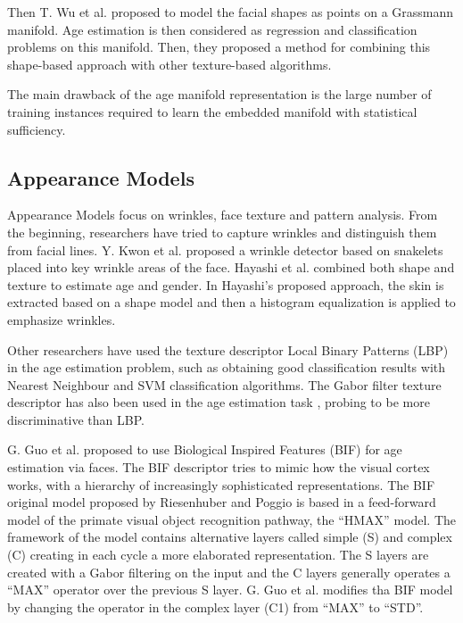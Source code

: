 Then T. Wu et al. \cite{journals/tifs/WuTC12} proposed to model the facial shapes as points on a Grassmann manifold. Age estimation is then considered as regression and classification problems on this manifold. Then, they proposed a method for combining this shape-based approach with other texture-based algorithms.

The main drawback of the age manifold representation is the large number of training instances required to learn the embedded manifold with statistical sufficiency.

\subsection{Appearance Models}

Appearance Models focus on wrinkles, face texture and pattern analysis. From the beginning, researchers have tried to capture wrinkles and distinguish them from facial lines. Y. Kwon et al. \cite{Kwon:1999:ACF:311844.311845} proposed a wrinkle detector based on snakelets \cite{Kass88snakes:active} placed into key wrinkle areas of the face. Hayashi et al. \cite{969698} \cite{1195171} \cite{conf/icpr/HayashiYIK02} combined both shape and texture to estimate age and gender. In Hayashi's proposed approach, the skin is extracted based on a shape model and then a histogram equalization is applied to emphasize wrinkles.

Other researchers have used the texture descriptor Local Binary Patterns (LBP) \cite{Ahonen:2006:FDL:1175897.1176245} in the age estimation problem, such as \cite{4717926} \cite{6460367} obtaining good classification results with Nearest Neighbour and SVM classification algorithms. The Gabor \cite{Liu:2002:GFB:2319007.2320264} filter texture descriptor has also been used in the age estimation task  \cite{Gao:2009:FAC:1567988.1568003}, probing to be more discriminative than LBP.

G. Guo et al. \cite{conf/cvpr/GuoMFH09} proposed to use Biological Inspired Features (BIF) \cite{Riesenhuber99hierarchicalmodels} for age estimation via faces. The BIF descriptor tries to mimic how the visual cortex works, with a hierarchy of increasingly sophisticated representations. The BIF original model proposed by Riesenhuber and Poggio \cite{Riesenhuber99hierarchicalmodels} is based in a feed-forward model of the primate visual object recognition pathway, the ``HMAX'' model. The framework of the model contains alternative layers called simple (S) and complex (C) creating in each cycle a more elaborated representation. The S layers are created with a Gabor filtering on the input and the C layers generally operates a ``MAX'' operator over the previous S layer. G. Guo et al. \cite{conf/cvpr/GuoMFH09} modifies tha BIF model by changing the operator in the complex layer (C1) from ``MAX'' to ``STD''.

